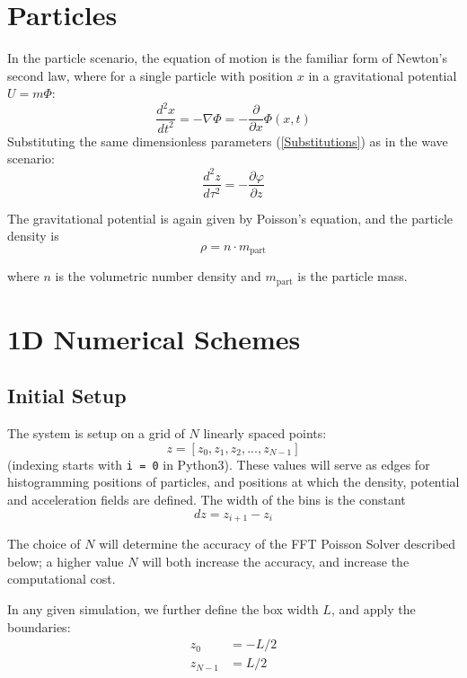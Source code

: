 \documentclass{article}
\newcommand{\pd}{\partial}
\begin{document}
\section{Particles}
In the particle scenario, the equation of motion is the familiar form of Newton's second law, where for a single particle with position $x$ in a gravitational potential $U = m\Phi$:
$$\frac{d^2 x}{d t^2} = -\nabla\Phi = -\frac{\pd}{\pd x}\Phi(x,t)$$
Substituting the same dimensionless parameters (\ref{Substitutions}) as in the wave scenario:
$$\frac{d^2 z}{d\tau^2} = -\frac{\pd \varphi}{\pd z}$$

The gravitational potential is again given by Poisson's equation, and the particle density is 
\begin{equation}
\rho = n \cdot m_{\text{part}}
\label{Particle density}
\end{equation}

where $n$ is the volumetric number density and $m_{\text{part}}$ is the particle mass.

\section{1D Numerical Schemes}

\subsection{Initial Setup}
The system is setup on a grid of $N$ linearly spaced points:
$$z = [z_0, z_1, z_2, ..., z_{N-1}]$$
(indexing starts with \texttt{i = 0} in Python3). These values will serve as edges for histogramming positions of particles, and positions at which the density, potential and acceleration fields are defined. The width of the bins is the constant
$$dz = z_{i+1} - z_i$$

The choice of $N$ will determine the accuracy of the FFT Poisson Solver described below; a higher value $N$ will both increase the accuracy, and increase the computational cost. 

In any given simulation, we further define the box width $L$, and apply the boundaries:
\begin{align}
    z_0 &= -L/2 \\ 
    z_{N-1} &= L/2
\end{align}

\end{document}
